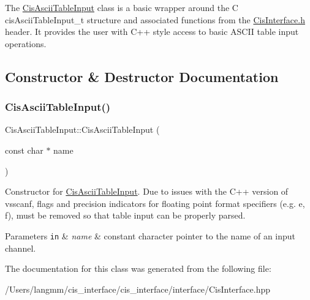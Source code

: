 The \mbox{\hyperlink{classCisAsciiTableInput}{Cis\+Ascii\+Table\+Input}} class is a basic wrapper around the C cis\+Ascii\+Table\+Input\+\_\+t structure and associated functions from the \mbox{\hyperlink{CisInterface_8h_source}{Cis\+Interface.\+h}} header. It provides the user with C++ style access to basic A\+S\+C\+II table input operations. 

\subsection{Constructor \& Destructor Documentation}
\mbox{\label{classCisAsciiTableInput_ae87bf636c04e42a7ab745eb164c52b41}} 
\subsubsection{\texorpdfstring{Cis\+Ascii\+Table\+Input()}{CisAsciiTableInput()}}
{\footnotesize\ttfamily Cis\+Ascii\+Table\+Input\+::\+Cis\+Ascii\+Table\+Input (\begin{DoxyParamCaption}\item[{const char $\ast$}]{name }\end{DoxyParamCaption})\hspace{0.3cm}{\ttfamily [inline]}}



Constructor for \mbox{\hyperlink{classCisAsciiTableInput}{Cis\+Ascii\+Table\+Input}}. Due to issues with the C++ version of vsscanf, flags and precision indicators for floating point format specifiers (e.\+g. e, f), must be removed so that table input can be properly parsed. 


\begin{DoxyParams}[1]{Parameters}
\mbox{\tt in}  & {\em name} & constant character pointer to the name of an input channel. \\
\hline
\end{DoxyParams}


The documentation for this class was generated from the following file\+:\begin{DoxyCompactItemize}
\item 
/\+Users/langmm/cis\+\_\+interface/cis\+\_\+interface/interface/Cis\+Interface.\+hpp\end{DoxyCompactItemize}
